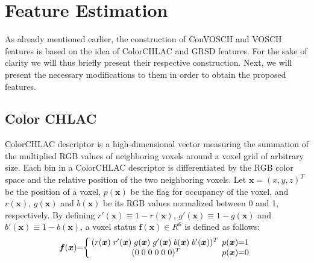 \documentclass[conference]{sty/IEEEtran}
\begin{document}
\section{Feature Estimation}
\label{sec:features}
As already mentioned earlier, the construction of ConVOSCH and VOSCH features is based on the idea of 
ColorCHLAC and GRSD features. For the sake of clarity we will thus briefly present
their respective construction.
Next, we will present the necessary modifications to them in order to obtain the proposed features.

\subsection{Color CHLAC}
\label{sec:color_chlac}
ColorCHLAC descriptor is a high-dimensional vector measuring the summation of the 
multiplied RGB values of neighboring voxels around a voxel grid of arbitrary size. 
Each bin in a ColorCHLAC descriptor is differentiated by the RGB color space and the 
relative position of the two neighboring voxels. 
Let $\bm{x}=(x,y,z)^T$ be the position of a voxel, $p(\bm{x})$ be the flag for occupancy 
of the voxel, and $r(\bm{x})$, $g(\bm{x})$ and $b(\bm{x})$ be its RGB values normalized 
between 0 and 1, respectively.  By defining 
$r'(\bm{x}) \equiv 1 - r(\bm{x})$, $g'(\bm{x}) \equiv 1 - g(\bm{x})$ and $b'(\bm{x}) \equiv 1 - b(\bm{x})$, 
a voxel status $\bm{f}(\bm{x})\in R^6$ is defined as follows: 
\begin{eqnarray}
  \label{eq:voxel}
  \bm{f}({\bm x})\hspace{-1mm}=\hspace{-1mm}\left\{
  \begin{array}{cc}
    \hspace{-1mm}
    (r({\bm x})\hspace{1mm} r'({\bm x}) \hspace{1mm}g({\bm x}) \hspace{1mm}g'({\bm x}) \hspace{1mm}b({\bm x}) \hspace{1mm}b'({\bm x}))^T & \hspace{-2mm}p({\bm x})\hspace{-1mm}=\hspace{-1mm}1 \\
    (0\hspace{1mm}0\hspace{1mm}0\hspace{1mm}0\hspace{1mm}0\hspace{1mm}0)^T & \hspace{-2mm}p({\bm x})\hspace{-1mm}=\hspace{-1mm}0
  \end{array}\right.
\end{eqnarray}
\end{document}
